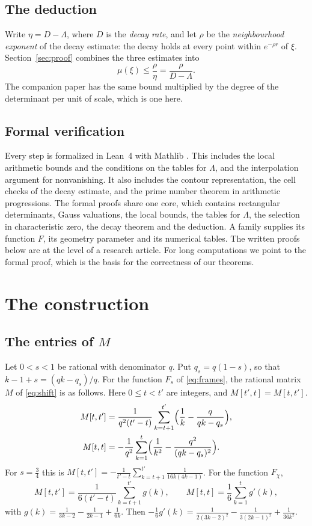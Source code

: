 \documentclass[11pt]{amsart}
\theoremstyle{definition}
\theoremstyle{remark}
\numberwithin{equation}{section}
\begin{document}
\subsection{The deduction}
Write $\eta=D-\Lambda$, where $D$ is the \emph{decay rate}, and let $\rho$ be the \emph{neighbourhood exponent} of the
decay estimate: the decay holds at every point within $e^{-\rho r}$ of $\xi$. Section~\ref{sec:proof} combines the
three estimates into
\[
 \mu(\xi)\le\frac\rho\eta=\frac\rho{D-\Lambda}.
\]
The companion paper \cite{Litsey2026} has the same bound multiplied by the degree of the determinant per unit of
scale, which is one here.

\subsection{Formal verification}
Every step is formalized in Lean~4 with Mathlib \cite{Lean4,Mathlib}. This includes the local arithmetic bounds and the
conditions on the tables for $\Lambda$, and the interpolation argument for nonvanishing. It also includes the contour
representation, the cell checks of the decay estimate, and the prime number theorem in arithmetic progressions. The
formal proofs share one core, which
contains rectangular determinants, Gauss valuations, the local bounds, the tables for $\Lambda$, the selection in
characteristic zero, the decay theorem and the deduction. A family supplies its function $F$, its geometry parameter and
its numerical tables. The written proofs below are at the level of a research article. For long computations we point
to the formal proof, which is the basis for the correctness of our theorems.

\section{The construction}\label{sec:construction}

\subsection{The entries of $M$}
Let $0<s<1$ be rational with denominator $q$. Put $q_s=q(1-s)$, so that $k-1+s=(qk-q_s)/q$. For the function $F_s$ of
\eqref{eq:frames}, the rational matrix $M$ of \eqref{eq:shift} is as follows. Here $0\le t<t'$ are integers, and
$M[t',t]=M[t,t']$.
\begin{align*}
 M[t,t']&=\frac1{q^2(t'-t)}\sum_{k=t+1}^{t'}\Bigl(\frac1k-\frac q{qk-q_s}\Bigr),\\
 M[t,t]&=-\frac1{q^2}\sum_{k=1}^{t}\Bigl(\frac1{k^2}-\frac{q^2}{(qk-q_s)^2}\Bigr).
\end{align*}
For $s=\frac34$ this is $M[t,t']=-\frac1{t'-t}\sum_{k=t+1}^{t'}\frac1{16k(4k-1)}$. For the function $F_\chi$,
\[
 M[t,t']=\frac1{6(t'-t)}\sum_{k=t+1}^{t'}g(k),\qquad M[t,t]=\frac16\sum_{k=1}^{t}g'(k),
\]
with $g(k)=\frac1{3k-2}-\frac1{2k-1}+\frac1{6k}$. Then
$-\frac16g'(k)=\frac1{2(3k-2)^2}-\frac1{3(2k-1)^2}+\frac1{36k^2}$.
\end{document}
